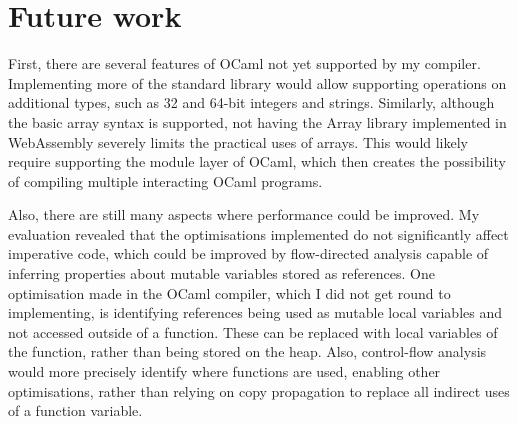 \section{Future work}
First, there are several features of OCaml not yet supported by my compiler. Implementing more of the standard library would allow supporting operations on additional types, such as 32 and 64-bit integers and strings.
Similarly, although the basic array syntax is supported, not having the Array library implemented in WebAssembly severely limits the practical uses of arrays. This would likely require supporting the module layer of OCaml, which then creates the possibility of compiling multiple interacting OCaml programs.


Also, there are still many aspects where performance could be improved. 
My evaluation revealed that the optimisations implemented do not significantly affect imperative code, which could be improved by flow-directed analysis capable of inferring properties about mutable variables stored as references.
%
One optimisation made in the OCaml compiler, which I did not get round to implementing, is identifying references being used as mutable local variables and not accessed outside of a function. These can be replaced with local variables of the function, rather than being stored on the heap.
Also, control-flow analysis would more precisely identify where functions are used, enabling other optimisations, rather than relying on copy propagation to replace all indirect uses of a function variable.

